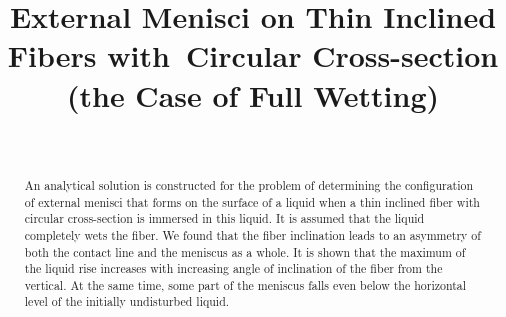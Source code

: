 \documentclass[
11pt,%
tightenlines,%
twoside,%
onecolumn,%
nofloats,%
nobibnotes,%
nofootinbib,%
superscriptaddress,%
noshowpacs,%
centertags]%
{revtex4-2}
\begin{document}
\title{External Menisci on Thin Inclined Fibers with~Circular Cross-section (the Case of Full
Wetting)}
\author{~}

 



\begin{abstract} %
An analytical solution is constructed for the problem of determining the configuration of external
menisci that forms on the surface of a liquid when a thin inclined fiber with circular
cross-section is immersed in this liquid. It is assumed that the liquid completely wets the fiber.
We found that the fiber inclination leads to an asymmetry of both the contact line and the meniscus
as a whole. It is shown that the maximum of the liquid rise increases with increasing angle of
inclination of the fiber from the vertical. At the same time, some part of the meniscus falls even below the horizontal level of the initially undisturbed liquid.
\end{abstract}


%

\maketitle



\end{document}
